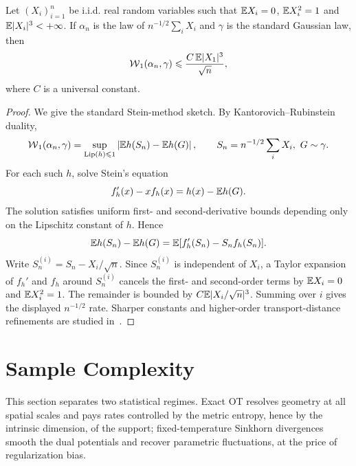 \begin{prop}\label{prop-berry-esseen-w1}
	Let $(X_i)_{i=1}^n$ be i.i.d. real random variables such that $\mathbb{E} X_i=0$, $\mathbb{E} X_i^2=1$ and $\mathbb{E} |X_i|^3<+\infty$. If $\alpha_n$ is the law of $n^{-1/2}\sum_i X_i$ and $\gamma$ is the standard Gaussian law, then
	\[
		\operatorname{\mathcal{W}}_1(\alpha_n,\gamma)
		\leqslant
		\frac{C\,\mathbb{E} |X_1|^3}{\sqrt n},
	\]
	where $C$ is a universal constant.
\end{prop}

\begin{proof}
	We give the standard Stein-method sketch. By Kantorovich--Rubinstein duality,
	\[
		\operatorname{\mathcal{W}}_1(\alpha_n,\gamma)
		=
		\sup_{\operatorname{Lip}(h)\leqslant1}
		\left|\mathbb{E} h(S_n)-\mathbb{E} h(G)\right|,
		\qquad
		S_n=n^{-1/2}\sum_i X_i,\ G\sim\gamma.
	\]
	For each such $h$, solve Stein's equation
	\[
		f_h'(x)-x f_h(x)=h(x)-\mathbb{E} h(G).
	\]
	The solution satisfies uniform first- and second-derivative bounds depending only on the Lipschitz constant of $h$. Hence
	\[
		\mathbb{E} h(S_n)-\mathbb{E} h(G)=\mathbb{E}[f_h'(S_n)-S_nf_h(S_n)].
	\]
	Write \(S_n^{(i)}=S_n-X_i/\sqrt n\).  Since \(S_n^{(i)}\) is independent of \(X_i\), a Taylor expansion of \(f_h'\) and \(f_h\) around \(S_n^{(i)}\) cancels the first- and second-order terms by \(\mathbb{E} X_i=0\) and \(\mathbb{E} X_i^2=1\).  The remainder is bounded by \(C\mathbb{E} |X_i/\sqrt n|^3\).  Summing over \(i\) gives the displayed \(n^{-1/2}\) rate. Sharper constants and higher-order transport-distance refinements are studied in~\cite{bobkov2018berry,rio2011asymptotic}.
\end{proof}


\section{Sample Complexity}
\label{sec-sample-complexity}

This section separates two statistical regimes. Exact OT resolves geometry at all spatial scales and pays rates controlled by the metric entropy, hence by the intrinsic dimension, of the support; fixed-temperature Sinkhorn divergences smooth the dual potentials and recover parametric fluctuations, at the price of regularization bias.


